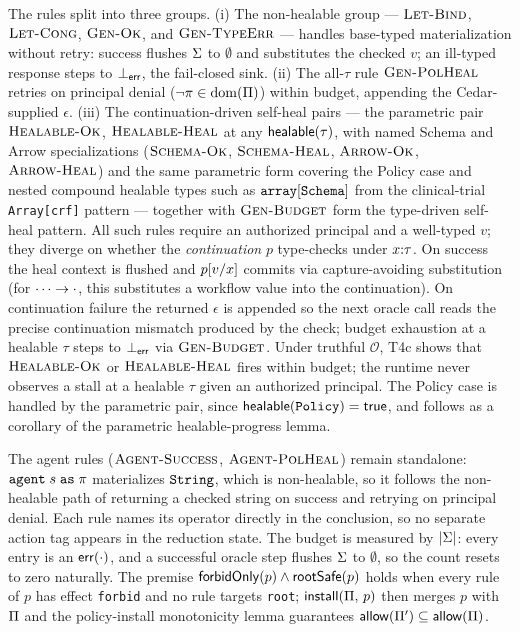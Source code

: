 \begin{sloppypar}
The rules split into three groups. (i) The non-healable group ---
$\rulename{Let-Bind}$, $\rulename{Let-Cong}$, $\rulename{Gen-Ok}$, and
$\rulename{Gen-TypeErr}$ --- handles base-typed materialization without
retry: success flushes $\MErr$ to $\emptyset$ and substitutes the
checked $v$; an ill-typed response steps to $\errV$, the fail-closed
sink. (ii) The all-$\tau$ rule $\rulename{Gen-PolHeal}$ retries on
principal denial ($\lnot\PolAllow{\MPol}{\MPrin}{\texttt{gen}}$) within
budget, appending the Cedar-supplied $\epsilon$. (iii) The
continuation-driven self-heal pairs --- the parametric pair
$\rulename{Healable-Ok}$, $\rulename{Healable-Heal}$ at any
$\Healable{\tau}$, with named Schema and Arrow specializations
($\rulename{Schema-Ok}$, $\rulename{Schema-Heal}$,
$\rulename{Arrow-Ok}$, $\rulename{Arrow-Heal}$) and the same
parametric form covering the Policy case and nested compound healable
types such as $\Tarr{\Tschema}$ from the clinical-trial
\texttt{Array[crf]} pattern --- together with $\rulename{Gen-Budget}$
form the type-driven self-heal pattern. All such rules require an
authorized principal and a well-typed $v$; they diverge on whether the
\emph{continuation} $p$ type-checks under $\Gext{x}{\tau}$. On success
the heal context is flushed and $\Subst{p}{v}$ commits via
capture-avoiding substitution (for $\Tarrow{\cdots}{\cdot}$, this
substitutes a workflow value into the continuation). On continuation failure the returned
$\epsilon$ is appended so the next oracle call reads the precise
continuation mismatch produced by the check; budget exhaustion at a
healable $\tau$ steps to $\errV$ via $\rulename{Gen-Budget}$. Under
truthful $\mathcal{O}$, T4c shows that $\rulename{Healable-Ok}$ or
$\rulename{Healable-Heal}$ fires within budget; the runtime never
observes a stall at a healable $\tau$ given an authorized principal.
The Policy case is handled by the parametric pair, since
$\Healable{\Tpolicy} = \mathsf{true}$, and follows as a corollary of the parametric healable-progress lemma.
\end{sloppypar}

\begin{sloppypar}
The agent rules ($\rulename{Agent-Success}$, $\rulename{Agent-PolHeal}$)
remain standalone: $\Agent{s}{\MPrin}$ materializes $\Tstring$, which
is non-healable, so it follows the non-healable path of returning a
checked string on success and retrying on principal denial. Each rule
names its operator directly in the conclusion, so no separate action
tag appears in the reduction state. The budget is measured by
$|\MErr|$: every entry is an $\ErrEv{\cdot}$, and a successful oracle
step flushes $\MErr$ to $\emptyset$, so the count resets to zero
naturally. The premise $\InstallOk{p}$ holds when every rule of $p$ has
effect \texttt{forbid} and no rule targets \texttt{root};
$\Install{\MPol}{p}$ then merges $p$ with $\MPol$ and the
policy-install monotonicity lemma guarantees
$\Allow{\MPol'} \subseteq \Allow{\MPol}$.
\end{sloppypar}

